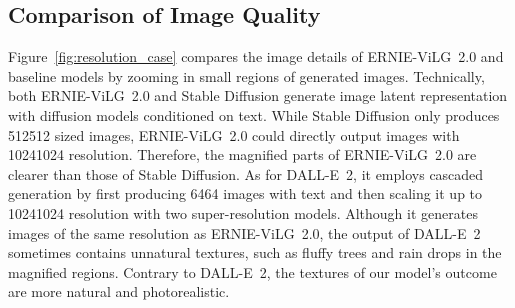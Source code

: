 \documentclass[10pt,twocolumn,letterpaper]{article}
\begin{document}
\subsection{Comparison of Image Quality}\label{appx:definition}
Figure~\ref{fig:resolution_case} compares the image details of ERNIE-ViLG~2.0 and baseline models by zooming in small regions of generated images.
Technically, both ERNIE-ViLG~2.0 and Stable Diffusion generate image latent representation with diffusion models conditioned on text. While Stable Diffusion only produces 512512 sized images, ERNIE-ViLG~2.0 could directly output images with 10241024 resolution. Therefore, the magnified parts of ERNIE-ViLG~2.0 are clearer than those of Stable Diffusion.
As for DALL-E~2, it employs cascaded generation by first producing 6464 images with text and then scaling it up to 10241024 resolution with two super-resolution models.
Although it generates images of the same resolution as ERNIE-ViLG~2.0, the output of DALL-E~2 sometimes contains unnatural textures, such as fluffy trees and rain drops in the magnified regions.
Contrary to DALL-E~2, the textures of our model's outcome are more natural and photorealistic.
\end{document}
